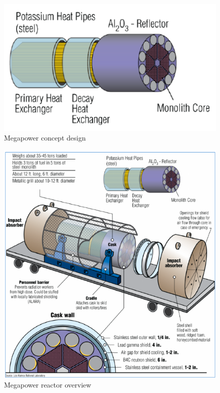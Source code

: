 \documentclass[10pt,a4paper]{article}
\begin{document}
\begin{figure}[hbtp]
\centering
\includegraphics[scale=0.8]{Figs/megacore.jpeg}
\caption{Megapower concept design}
\label{Megadesign}
\end{figure}

\begin{figure}[hbtp]
\centering
\includegraphics[scale=0.7]{Figs/megacask.jpeg}
\caption{Megapower reactor overview}
\label{Megaoverview}
\end{figure}
\end{document}

